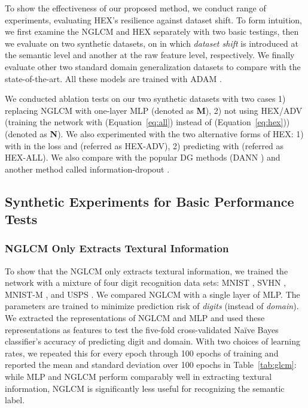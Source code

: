 To show the effectiveness of our proposed method, 
we conduct range of experiments, 
evaluating HEX's resilience against dataset shift.
To form intuition, we first examine the NGLCM and HEX 
separately with two basic testings, 
then we evaluate on two synthetic datasets, 
on in which \textit{dataset shift} is introduced at the semantic level 
and another at the raw feature level, respectively. 
We finally evaluate other two standard domain generalization datasets 
to compare with the state-of-the-art. 
All these models are trained with ADAM \citep{kingma2014adam}. 

We conducted ablation tests on our two synthetic datasets 
with two cases 1) replacing NGLCM with one-layer MLP (denoted as \textbf{M}), 
2) not using HEX/ADV (training the network with  (Equation~\ref{eq:all})
instead of  (Equation~\ref{eq:hex})) (denoted as \textbf{N}). 
We also experimented with the two alternative forms of HEX: 
1) with  in the loss and  (referred as HEX-ADV), 
2) predicting with  (referred as HEX-ALL).
We also compare with the popular DG methods (DANN \citep{ganin2016domain}) 
and another method called information-dropout \citep{achille2018information}. 

\subsection{Synthetic Experiments for Basic Performance Tests}
\label{sec:synthetic}

\subsubsection{NGLCM Only Extracts Textural Information}
To show that the NGLCM only extracts textural information, 
we trained the network with a mixture of four digit recognition data sets: MNIST \citep{lecun1998gradient}, SVHN \citep{netzer2011reading}, 
MNIST-M \citep{ganin2014unsupervised}, 
and USPS \citep{denker1989neural}. 
We compared NGLCM with a single layer of MLP. 
The parameters are trained to minimize prediction risk of \textit{digits} (instead of \textit{domain}).
We extracted the representations of NGLCM and MLP 
and used these representations as features to test 
the five-fold cross-validated Na\"ive Bayes classifier's accuracy 
of predicting digit and domain. 
With two choices of learning rates, 
we repeated this for every epoch through 100 epochs of training 
and reported the mean and standard deviation 
over 100 epochs in Table~\ref{tab:glcm}: 
while MLP and NGLCM perform comparably well 
in extracting textural information, 
NGLCM is significantly less useful for recognizing the semantic label. 

